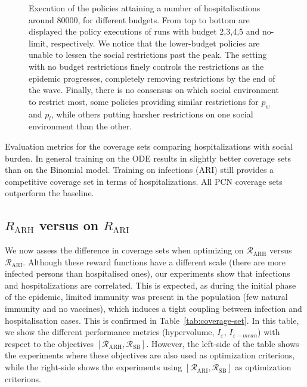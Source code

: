 \documentclass{article}
\newcommand{\mdprewardfn}{\mathcal{R}}
\begin{document}
\begin{figure}
    \centering
    
    \caption{Execution of the policies attaining a number of hospitalisations around $80000$, for different budgets. From top to bottom are displayed the policy executions of runs with budget 2,3,4,5 and no-limit, respectively. We notice that the lower-budget policies are unable to lessen the social restrictions past the peak. The setting with no budget restrictions finely controls the restrictions as the epidemic progresses, completely removing restrictions by the end of the wave. Finally, there is no consensus on which social environment to restrict most, some policies providing similar restrictions for $p_w$ and $p_l$, while others putting harsher restrictions on one social environment than the other.
    }
    \label{fig:pe-binomial-arh-budgets}
\end{figure}

\begin{table}[t]
  \centering
  \setlength{\tabcolsep}{0.5em} %
  {\renewcommand{\arraystretch}{1.2}%
  
  }
  \caption{Evaluation metrics for the coverage sets comparing hospitalizations with social burden. In general training on the ODE results in slightly better coverage sets than on the Binomial model. Training on infections (ARI) still provides a competitive coverage set in terms of hospitalizations. All PCN coverage sets outperform the baseline.}
  \label{tab:coverage-set}
\end{table}

\subsection{$R_\text{ARH}$ versus on $R_\text{ARI}$}
\label{sec:arh-vs-ari}

We now assess the difference in coverage sets when optimizing on $\mdprewardfn_\text{ARH}$ versus $\mdprewardfn_\text{ARI}$. Although these reward functions have a different scale (there are more infected persons than hospitalised ones), our experiments show that infections and hospitalizations are correlated. This is expected, as during the initial phase of the epidemic, limited immunity was present in the population (few natural immunity and no vaccines), which induces a tight coupling between infection and hospitalisation cases. This is confirmed in Table~\ref{tab:coverage-set}. In this table, we show the different performance metrics (hypervolume, $I_\varepsilon$, $I_{\varepsilon-mean}$) with respect to the objectives $[\mdprewardfn_\text{ARH}, \mdprewardfn_\text{SB}]$. However, the left-side of the table shows the experiments where these objectives are also used as optimization criterions, while the right-side shows the experiments using $[\mdprewardfn_\text{ARI}, \mdprewardfn_\text{SB}]$ as optimization criterions.
\end{document}
